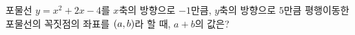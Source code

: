 포물선 $y=x^2+2x-4$를 $x$축의 방향으로 $-1$만큼, $y$축의 방향으로 $5$만큼 평행이동한 포물선의 꼭짓점의 좌표를 $(a{,}\mkern3mu\mathopen{}b)$라 할 때, $a+b$의 값은?
